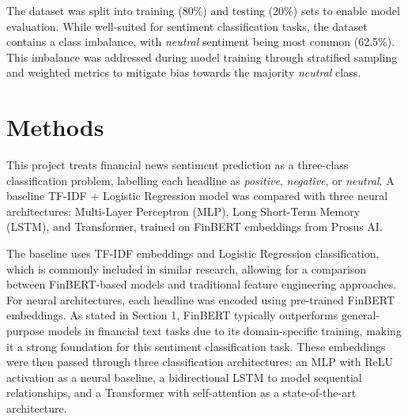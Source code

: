 \documentclass[english]{article}
\begin{document}
\vspace{-0.6em}

The dataset was split into training (80\%) and testing (20\%) sets to enable model evaluation. 
While well-suited for sentiment classification tasks, the dataset contains a class imbalance, 
with \textit{neutral} sentiment being most common (62.5\%). This imbalance was addressed during model training through 
stratified sampling and weighted metrics to mitigate
bias towards the majority \textit{neutral} class.

\vspace{-1em}

\section{Methods}

\vspace{-0.5em}


This project treats financial news sentiment prediction as a three-class classification problem, 
labelling each headline as \textit{positive}, \textit{negative}, or \textit{neutral}. A baseline TF-IDF + Logistic Regression model 
was compared with three neural architectures: Multi-Layer Perceptron (MLP), Long Short-Term Memory (LSTM), and Transformer, trained on FinBERT
embeddings from Prosus AI\cite{ProsusAI2023-yv}.

The baseline uses TF-IDF embeddings\cite{HavrlantLukáš2017Aspe} and Logistic Regression classification\cite{alma991015141909707446},
which is commonly included in similar research\cite{Karanikola2023-rh}, allowing for a comparison between
FinBERT-based models and traditional feature engineering approaches.
For neural architectures, each headline was encoded using pre-trained FinBERT embeddings\cite{Huang2023-zl}.
As stated in Section 1, FinBERT typically outperforms general-purpose models in financial text tasks due to its domain-specific training, 
making it a strong foundation for this sentiment classification task\cite{Huang2023-zl}.
These embeddings were then passed through three classification architectures: an MLP with ReLU activation\cite{Goodfellow2023-tx} as
a neural baseline, 
a bidirectional LSTM to model sequential relationships\cite{Sharaff2023-cy}, 
and a Transformer with self-attention\cite{Vaswani2017-dz} as a state-of-the-art architecture. 
\end{document}
